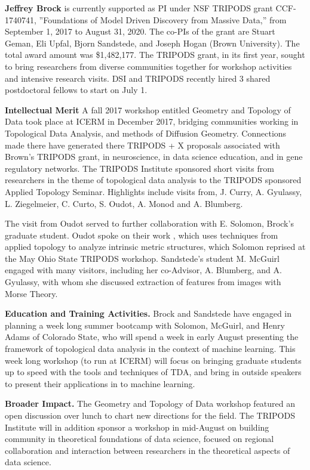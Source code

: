 

\textbf{Jeffrey Brock} is currently supported as PI under NSF TRIPODS grant CCF-1740741, ''Foundations of Model Driven Discovery from Massive Data,'' from September 1, 2017 to August 31, 2020. The co-PIs of the grant are Stuart Geman, Eli Upfal, Bjorn Sandstede, and Joseph Hogan (Brown University). The total award amount was \$1,482,177. The TRIPODS grant, in its first year, sought to bring researchers from diverse communities together for workshop activities and intensive research visits. DSI and TRIPODS recently hired 3 shared postdoctoral fellows to start on July 1.

\textbf{Intellectual Merit} A fall 2017 workshop entitled Geometry and Topology of Data took place at ICERM in December 2017, bridging communities working in Topological Data Analysis, and methods of Diffusion Geometry. Connections made there have generated there TRIPODS + X proposals associated with Brown's TRIPODS grant, in neuroscience, in data science education, and in gene regulatory networks. 
The TRIPODS Institute sponsored short visits from researchers in the theme of topological data analysis to the TRIPODS sponsored Applied Topology Seminar. Highlights include visits from, J. Curry, A. Gyulassy, L. Ziegelmeier, C. Curto, S. Oudot, A. Monod and A. Blumberg.

The visit from Oudot served to further collaboration with E. Solomon, Brock's graduate student. Oudot spoke on their work   \citep{Oudot:Solomon:persistence}, which uses techniques from applied topology to analyze intrinsic metric structures, which Solomon reprised at the May Ohio State TRIPODS workshop. Sandstede's student M. McGuirl engaged with many visitors, including her co-Advisor, A. Blumberg, and A. Gyulassy, with whom she discussed extraction of features from images with Morse Theory. 

{\bf Education and Training Activities.}
Brock and Sandstede have engaged in planning a week long summer bootcamp with Solomon, McGuirl, and Henry Adams of Colorado State, who will spend a week in early August presenting the framework of topological data analysis in the context of machine learning. This week long workshop (to run at ICERM) will focus on bringing graduate students up to speed with the tools and techniques of TDA, and bring in outside speakers to present their applications in to machine learning.

{\bf Broader Impact.} The Geometry and Topology of Data workshop featured an open discussion over lunch to chart new directions for the field. The TRIPODS Institute will in addition sponsor a workshop in mid-August on building community in theoretical foundations of data science, focused on regional collaboration and interaction between researchers in the theoretical aspects of data science.
